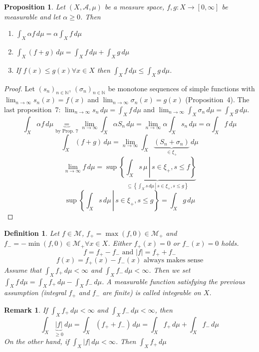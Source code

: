 \documentclass{article}
\newtheorem{definition}{Definition}  \numberwithin{definition}{section}
\newtheorem{remark}{Remark}  \numberwithin{remark}{section}
\newtheorem{proposition}{Proposition}  \numberwithin{proposition}{section}
\newcommand{\setdef}[2]{\left\{\left.#1\,\right|\,#2\right\}}
\newcommand{\card}[1]{\left|#1\right|}
\begin{document}
\begin{proposition} %
  Let $(X, \mathcal A, \mu)$ be a measure space, $f, g: X \to [0,\infty]$ be measurable and let $\alpha \geq 0$. Then
  \begin{enumerate}
  	\item $\int_X \alpha f \, d\mu = \alpha \int_X f \, d\mu$
  	\item $\int_X(f+g) \, d\mu = \int_X f \, d\mu + \int_X g \, d\mu$
  	\item If $f(x) \leq g(x) \forall x \in X$ then $\int_X f \, d\mu \leq \int_X g \, d\mu$.
  \end{enumerate}
\end{proposition}

\begin{proof}
   Let $(s_n)_{n \in \mathbb N}$, $(\sigma_n)_{n\in\mathbb N}$ be monotone sequences of simple functions with $\lim_{n\to\infty} s_n(x) = f(x)$ and $\lim_{n\to\infty} \sigma_n(x) = g(x)$ (Proposition~4). The last proposition~7: $\lim_{n\to\infty} s_n \, d\mu = \int_X f \, d\mu$ and $\lim_{n\to\infty} \int_X \sigma_n \, d\mu = \int_X g \, d\mu$.
   \[ \int_X \alpha f \, d\mu \underbrace{=}_{\text{by Prop.~7}} \lim_{n\to\infty} \int_X \alpha S_n \, d\mu = \lim_{n\to\infty} \alpha \int_X s_n \, d\mu = \alpha \int_X f \, d\mu \]
   \[ \int_X (f+g) \, d\mu = \lim_{n\to\infty} \int_X \underbrace{(S_n + \sigma_n)}_{\in \xi_+} \, d\mu \]
   \[ \lim_{n\to\infty} f \, d\mu = \sup\underbrace{\setdef{\int_X s \, \mu}{s \in \xi_+, s \leq f}}_{\subseteq \setdef{\int_X s \, d\mu}{s \in \xi_+, s \leq g}} \]
   \[ \sup\setdef{\int_X s \, d\mu}{s \in \xi_+, s \leq g} = \int_X g \, d\mu \]
\end{proof}

\begin{definition}
  Let $f \in \mathcal M$, $f_+ = \max(f, 0) \in \mathcal M_+$ and $f_- = -\min(f, 0) \in \mathcal M_+ \forall x \in X$.
  Either $f_+(x) = 0$ or $f_-(x) = 0$ holds.
  \[ f = f_+ - f_- \text{ and } \card{f} = f_+ + f_- \]
  \[ f(x) = f_+(x) - f_-(x) \text{ always makes sense} \]
  Assume that $\int_X f_+ \, d\mu < \infty$ and $\int_X f_- \, d\mu < \infty$.
  Then we set $\int_X f \, d\mu = \int_X f_+ \, d\mu - \int_X f_- \, d\mu$.
  A measurable function satisfying the previous assumption (integral $f_+$ and $f_-$ are finite)
  is called \emph{integrable on $X$}.
\end{definition}

\begin{remark}
  If $\int_X f_+ \, d\mu < \infty$ and $\int_X f_- \, d\mu < \infty$, then
  \[ \int_X \underbrace{\card{f}}_{\geq 0} \, d\mu = \int_X (f_+ + f_-) \, d\mu = \int_X f_+ \, d\mu + \int_X f_- \, d\mu \]
  On the other hand, if $\int_X \card{f} \, d\mu < \infty$. Then $\int_X f_+ \, d\mu$ %
\end{remark}
\end{document}
